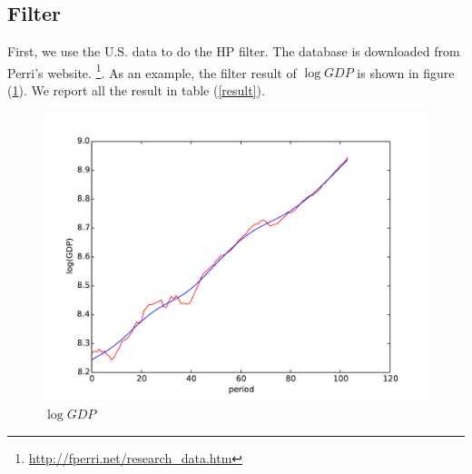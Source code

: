 \documentclass[11pt,a4paper]{article}
\begin{document}
\subsection{Filter}
First, we use the U.S. data to do the HP filter. The database is downloaded from Perri's website.
\footnote{\url{http://fperri.net/research_data.htm}}. As an example, the filter result of $\log GDP$ is shown  
in figure (\ref{gdp_filter}). We report all the result in table (\ref{result}).
\begin{figure}[H]
\begin{center}
\includegraphics[scale=0.5]{gdp_filter} 
\caption{$\log GDP$}
\label{gdp_filter}
\end{center}
\end{figure}
\end{document}
